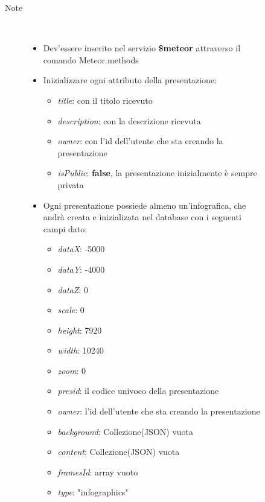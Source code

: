 \begin{description}
\begin{description}
\begin{description}
\begin{itemize}
				\end{itemize}
			\item[Note] \hfill \\
			\begin{itemize}
					\item Dev'essere inserito nel servizio \textbf{\$meteor} attraverso il comando Meteor.methods
					\item Inizializzare ogni attributo della presentazione:
					\begin{itemize}
					\item \textit{title}: con il titolo ricevuto
					\item \textit{description}: con la descrizione ricevuta
					\item \textit{owner}: con l'id dell'utente che sta creando la presentazione
					\item \textit{isPublic}: \textbf{false}, la presentazione inizialmente è sempre privata
					\end{itemize}
					\item Ogni presentazione possiede almeno un'infografica, che andrà creata e inizializata nel database con i seguenti campi dato:
					\begin{itemize}
					\item \textit{dataX}: -5000
					\item \textit{dataY}: -4000
					\item \textit{dataZ}: 0
					\item \textit{scale}: 0
					\item \textit{height}: 7920
					\item \textit{width}: 10240
					\item \textit{zoom}: 0
					\item \textit{presid}: il codice univoco della presentazione
					\item \textit{owner}: l'id dell'utente che sta creando la presentazione
					\item \textit{background}: Collezione(JSON) vuota
					\item \textit{content}: Collezione(JSON) vuota
					\item \textit{framesId}: array vuoto
					\item \textit{type}: "infographics"
					\end{itemize}
				\end{itemize}
		\end{description}
	\end{description}


\end{description}
